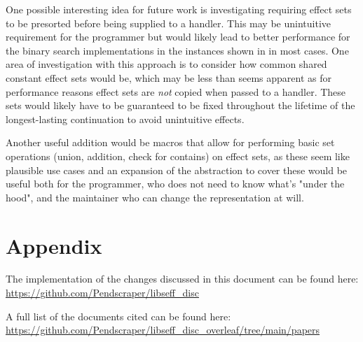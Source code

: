\documentclass[logo,bsc,singlespacing,parskip,online]{infthesis}
\begin{document}
One possible interesting idea for future work is investigating requiring effect sets to be presorted before being supplied to a handler. This may be unintuitive requirement for the programmer but would likely lead to better performance for the binary search implementations in the instances shown in  in most cases. One area of investigation with this approach is to consider how common shared constant effect sets would be, which may be less than seems apparent as for performance reasons effect sets are \textit{not} copied when passed to a handler. These sets would likely have to be guaranteed to be fixed throughout the lifetime of the longest-lasting continuation to avoid unintuitive effects.

Another useful addition would be macros that allow for performing basic set operations (union, addition, check for contains) on effect sets, as these seem like plausible use cases and an expansion of the abstraction to cover these would be useful both for the programmer, who does not need to know what's "under the hood", and the maintainer who can change the representation at will.

\clearpage
% 
%
%

\printbibliography

\nocite{*}


\appendix

\chapter*{Appendix} \label{appx}

The implementation of the changes discussed in this document can be found here: 
\url{https://github.com/Pendscraper/libseff_disc}

A full list of the documents cited can be found here:
\url{https://github.com/Pendscraper/libseff_disc_overleaf/tree/main/papers}
\end{document}
